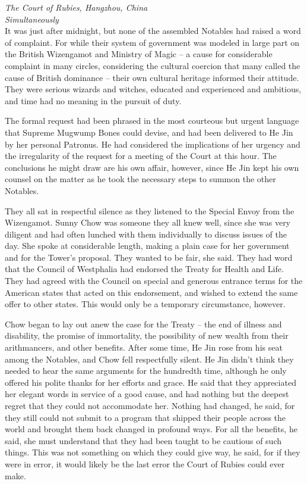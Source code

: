 \mybreak

\emph{The Court of Rubies, Hangzhou, China}\\
\emph{Simultaneously}\\

It was just after midnight, but none of the assembled Notables had
raised a word of complaint. For while their system of government was
modeled in large part on the British Wizengamot and Ministry of Magic --
a cause for considerable complaint in many circles, considering the
cultural coercion that many called the cause of British dominance --
their own cultural heritage informed their attitude. They were serious
wizards and witches, educated and experienced and ambitious, and time
had no meaning in the pursuit of duty.

The formal request had been phrased in the most courteous but urgent
language that Supreme Mugwump Bones could devise, and had been delivered
to He Jin by her personal Patronus. He had considered the implications
of her urgency and the irregularity of the request for a meeting of the
Court at this hour. The conclusions he might draw are his own affair,
however, since He Jin kept his own counsel on the matter as he took the
necessary steps to summon the other Notables.

They all sat in respectful silence as they listened to the Special Envoy
from the Wizengamot. Sunny Chow was someone they all knew well, since
she was very diligent and had often lunched with them individually to
discuss issues of the day. She spoke at considerable length, making a
plain case for her government and for the Tower's proposal. They wanted
to be fair, she said. They had word that the Council of Westphalia had
endorsed the Treaty for Health and Life. They had agreed with the
Council on special and generous entrance terms for the American states
that acted on this endorsement, and wished to extend the same offer to
other states. This would only be a temporary circumstance, however.

Chow began to lay out anew the case for the Treaty -- the end of illness
and disability, the promise of immortality, the possibility of new
wealth from their arithmancers, and other benefits. After some time, He
Jin rose from his seat among the Notables, and Chow fell respectfully
silent. He Jin didn't think they needed to hear the same arguments for
the hundredth time, although he only offered his polite thanks for her
efforts and grace. He said that they appreciated her elegant words in
service of a good cause, and had nothing but the deepest regret that
they could not accommodate her. Nothing had changed, he said, for they
still could not submit to a program that shipped their people across the
world and brought them back changed in profound ways. For all the
benefits, he said, she must understand that they had been taught to be
cautious of such things. This was not something on which they could give
way, he said, for if they were in error, it would likely be the last
error the Court of Rubies could ever make.

